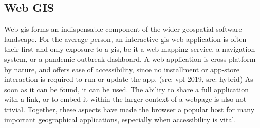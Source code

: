 



\subsection*{Web GIS}
Web \ac{gis} forms an indispensable component of the wider geospatial software landscape. 
For the average person, an interactive \ac{gis} web application is often their first and only exposure to a \acs{gis}, be it a web mapping service, a navigation system, or a pandemic outbreak dashboard. 
A web application is cross-platform by nature, and offers ease of accessibility, since no installment or app-store interaction is required to run or update the app. (src: vpl 2019, src: hybrid)
As soon as it can be found, it can be used.
The ability to share a full application with a link, or to embed it within the larger context of a webpage is also not trivial. 
Together, these aspects have made the browser a popular host for many important geographical applications, especially when accessibility is vital.




